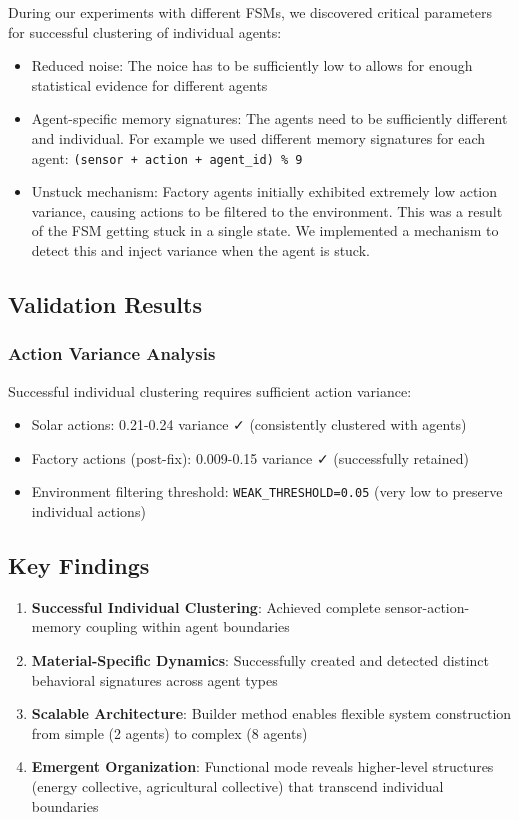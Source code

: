 \documentclass[10pt,conference]{IEEEtran}
\begin{document}
During our experiments with different FSMs, we discovered critical parameters for successful clustering of individual agents:
\begin{itemize}
  \item Reduced noise: The noice has to be sufficiently low to allows for enough statistical evidence for different agents
  \item Agent-specific memory signatures: The agents need to be sufficiently different and individual.  For example we used different memory signatures for each agent: \texttt{(sensor + action + agent\_id) \% 9}
  \item Unstuck mechanism: Factory agents initially exhibited extremely low action variance, causing actions to be filtered to the environment. This was a result of the FSM getting stuck in a single state. We implemented a mechanism to detect this and inject variance when the agent is stuck.
\end{itemize}


\subsection{Validation Results}

\subsubsection{Action Variance Analysis}
Successful individual clustering requires sufficient action variance:
\begin{itemize}
  \item Solar actions: 0.21-0.24 variance ✓ (consistently clustered with agents)
  \item Factory actions (post-fix): 0.009-0.15 variance ✓ (successfully retained)
  \item Environment filtering threshold: \texttt{WEAK\_THRESHOLD=0.05} (very low to preserve individual actions)
\end{itemize}

\subsection{Key Findings}
\begin{enumerate}
  \item \textbf{Successful Individual Clustering}: Achieved complete sensor-action-memory coupling within agent boundaries  
  \item \textbf{Material-Specific Dynamics}: Successfully created and detected distinct behavioral signatures across agent types
  \item \textbf{Scalable Architecture}: Builder method enables flexible system construction from simple (2 agents) to complex (8 agents)
  \item \textbf{Emergent Organization}: Functional mode reveals higher-level structures (energy collective, agricultural collective) that transcend individual boundaries
\end{enumerate}
\end{document}
